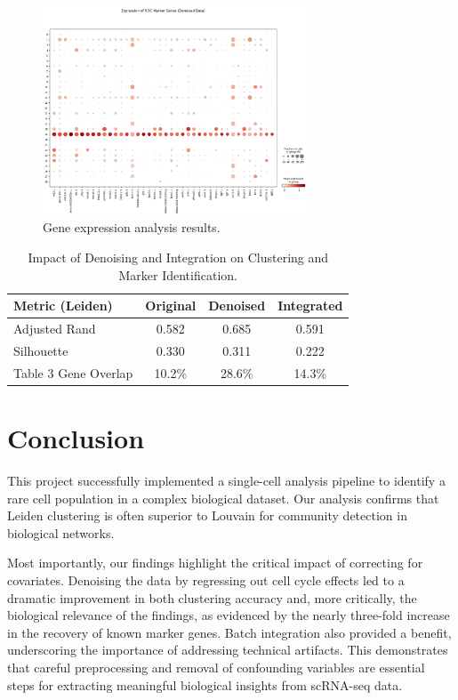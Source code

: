 \documentclass[12pt,letterpaper]{article}
\begin{document}
\begin{figure}[H]
    \centering
    \includegraphics[width=0.7\textwidth]{figures/gene_expression_dotplot.png}
    \caption{Gene expression analysis results.}
    \label{fig:gene_expression}
\end{figure}

\begin{table}[H]
\centering
\caption{Impact of Denoising and Integration on Clustering and Marker Identification.}
\begin{tabular}{|l|c|c|c|}
\hline
\textbf{Metric (Leiden)} & \textbf{Original} & \textbf{Denoised} & \textbf{Integrated} \\ \hline
Adjusted Rand & 0.582 & 0.685 & 0.591 \\ \hline
Silhouette & 0.330 & 0.311 & 0.222 \\ \hline
Table 3 Gene Overlap & 10.2\% & 28.6\% & 14.3\% \\ \hline
\end{tabular}
\end{table}

\section{Conclusion}
This project successfully implemented a single-cell analysis pipeline to identify a rare cell population in a complex biological dataset. Our analysis confirms that Leiden clustering is often superior to Louvain for community detection in biological networks.

Most importantly, our findings highlight the critical impact of correcting for covariates. Denoising the data by regressing out cell cycle effects led to a dramatic improvement in both clustering accuracy and, more critically, the biological relevance of the findings, as evidenced by the nearly three-fold increase in the recovery of known marker genes. Batch integration also provided a benefit, underscoring the importance of addressing technical artifacts. This demonstrates that careful preprocessing and removal of confounding variables are essential steps for extracting meaningful biological insights from scRNA-seq data.
\end{document}
